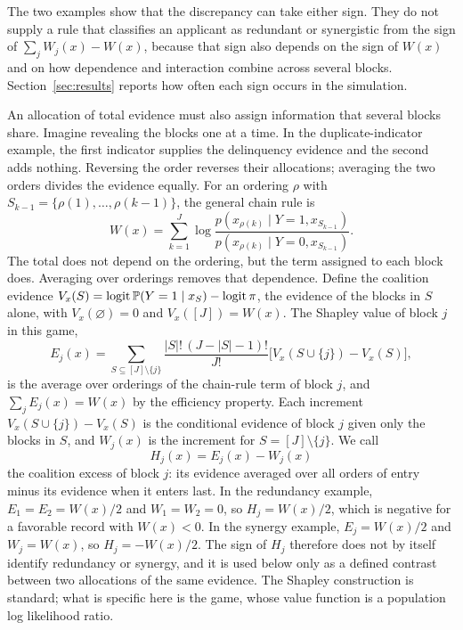 The two examples show that the discrepancy can take either sign. They do not supply a rule that classifies an applicant as redundant or synergistic from the sign of $\sum_jW_j(x)-W(x)$, because that sign also depends on the sign of $W(x)$ and on how dependence and interaction combine across several blocks. Section~\ref{sec:results} reports how often each sign occurs in the simulation.

An allocation of total evidence must also assign information that several blocks share. Imagine revealing the blocks one at a time. In the duplicate-indicator example, the first indicator supplies the delinquency evidence and the second adds nothing. Reversing the order reverses their allocations; averaging the two orders divides the evidence equally. For an ordering $\rho$ with $S_{k-1}=\{\rho(1),\ldots,\rho(k-1)\}$, the general chain rule is
\begin{equation}\label{eq:chain}
W(x)=\sum_{k=1}^J\log\frac{p(x_{\rho(k)}\mid Y=1,x_{S_{k-1}})}{p(x_{\rho(k)}\mid Y=0,x_{S_{k-1}})} .
\end{equation}
The total does not depend on the ordering, but the term assigned to each block does. Averaging over orderings removes that dependence. Define the coalition evidence $V_x(S)=\operatorname{logit}\mathbb P(Y=1\mid x_S)-\operatorname{logit}\pi$, the evidence of the blocks in $S$ alone, with $V_x(\varnothing)=0$ and $V_x([J])=W(x)$. The Shapley value of block $j$ in this game,
\begin{equation}\label{eq:shapley_evidence}
E_j(x)=\sum_{S\subseteq[J]\setminus\{j\}}\frac{|S|!\,(J-|S|-1)!}{J!}\bigl[V_x(S\cup\{j\})-V_x(S)\bigr],
\end{equation}
is the average over orderings of the chain-rule term of block $j$, and $\sum_jE_j(x)=W(x)$ by the efficiency property. Each increment $V_x(S\cup\{j\})-V_x(S)$ is the conditional evidence of block $j$ given only the blocks in $S$, and $W_j(x)$ is the increment for $S=[J]\setminus\{j\}$. We call
\begin{equation}\label{eq:shared}
H_j(x)=E_j(x)-W_j(x)
\end{equation}
the coalition excess of block $j$: its evidence averaged over all orders of entry minus its evidence when it enters last. In the redundancy example, $E_1=E_2=W(x)/2$ and $W_1=W_2=0$, so $H_j=W(x)/2$, which is negative for a favorable record with $W(x)<0$. In the synergy example, $E_j=W(x)/2$ and $W_j=W(x)$, so $H_j=-W(x)/2$. The sign of $H_j$ therefore does not by itself identify redundancy or synergy, and it is used below only as a defined contrast between two allocations of the same evidence. The Shapley construction is standard; what is specific here is the game, whose value function is a population log likelihood ratio.

